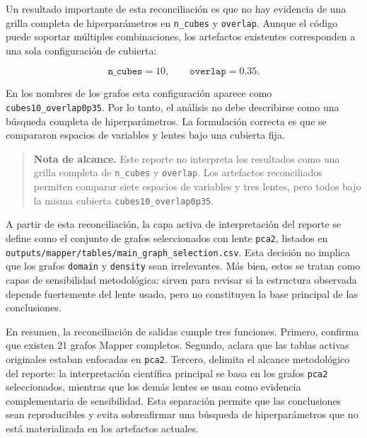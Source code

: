 Un resultado importante de esta reconciliación es que no hay evidencia de una grilla completa de hiperparámetros en \texttt{n\_cubes} y \texttt{overlap}. Aunque el código puede soportar múltiples combinaciones, los artefactos existentes corresponden a una sola configuración de cubierta:

\[
\texttt{n\_cubes}=10,\qquad \texttt{overlap}=0.35.
\]

En los nombres de los grafos esta configuración aparece como \texttt{cubes10\_overlap0p35}. Por lo tanto, el análisis no debe describirse como una búsqueda completa de hiperparámetros. La formulación correcta es que se compararon espacios de variables y lentes bajo una cubierta fija.

\begin{quote}
\textbf{Nota de alcance.} Este reporte no interpreta los resultados como una grilla completa de \texttt{n\_cubes} y \texttt{overlap}. Los artefactos reconciliados permiten comparar siete espacios de variables y tres lentes, pero todos bajo la misma cubierta \texttt{cubes10\_overlap0p35}.
\end{quote}

A partir de esta reconciliación, la capa activa de interpretación del reporte se define como el conjunto de grafos seleccionados con lente \texttt{pca2}, listados en \texttt{outputs/mapper/tables/main\_graph\_selection.csv}. Esta decisión no implica que los grafos \texttt{domain} y \texttt{density} sean irrelevantes. Más bien, estos se tratan como capas de sensibilidad metodológica: sirven para revisar si la estructura observada depende fuertemente del lente usado, pero no constituyen la base principal de las conclusiones.

En resumen, la reconciliación de salidas cumple tres funciones. Primero, confirma que existen 21 grafos Mapper completos. Segundo, aclara que las tablas activas originales estaban enfocadas en \texttt{pca2}. Tercero, delimita el alcance metodológico del reporte: la interpretación científica principal se basa en los grafos \texttt{pca2} seleccionados, mientras que los demás lentes se usan como evidencia complementaria de sensibilidad. Esta separación permite que las conclusiones sean reproducibles y evita sobreafirmar una búsqueda de hiperparámetros que no está materializada en los artefactos actuales.